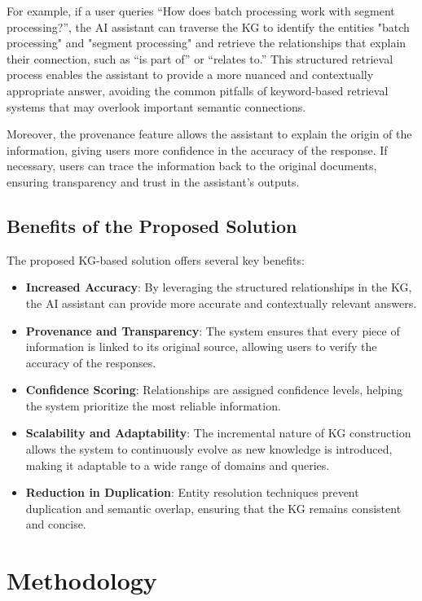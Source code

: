 For example, if a user queries “How does batch processing work with segment processing?”, the AI assistant can traverse the KG to identify the entities "batch processing" and "segment processing" and retrieve the relationships that explain their connection, such as “is part of” or “relates to.” This structured retrieval process enables the assistant to provide a more nuanced and contextually appropriate answer, avoiding the common pitfalls of keyword-based retrieval systems that may overlook important semantic connections.

Moreover, the provenance feature allows the assistant to explain the origin of the information, giving users more confidence in the accuracy of the response. If necessary, users can trace the information back to the original documents, ensuring transparency and trust in the assistant’s outputs.

\subsection{Benefits of the Proposed Solution}

The proposed KG-based solution offers several key benefits:
\begin{itemize}
    \item \textbf{Increased Accuracy}: By leveraging the structured relationships in the KG, the AI assistant can provide more accurate and contextually relevant answers.
    \item \textbf{Provenance and Transparency}: The system ensures that every piece of information is linked to its original source, allowing users to verify the accuracy of the responses.
    \item \textbf{Confidence Scoring}: Relationships are assigned confidence levels, helping the system prioritize the most reliable information.
    \item \textbf{Scalability and Adaptability}: The incremental nature of KG construction allows the system to continuously evolve as new knowledge is introduced, making it adaptable to a wide range of domains and queries.
    \item \textbf{Reduction in Duplication}: Entity resolution techniques prevent duplication and semantic overlap, ensuring that the KG remains consistent and concise.
\end{itemize}


\section{Methodology}

